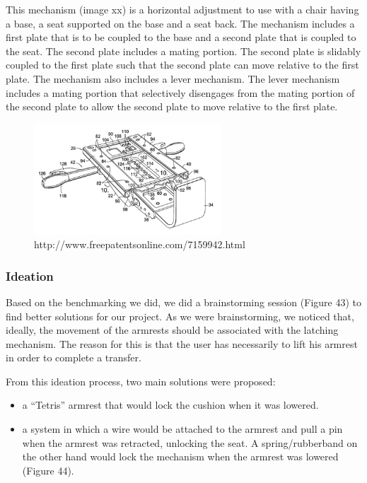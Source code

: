 This mechanism (image xx) is a horizontal adjustment to use with a chair having a base, a seat supported on the base and a seat back. The mechanism includes a first plate that is to be coupled to the base and a second plate that is coupled to the seat. The second plate includes a mating portion. The second plate is slidably coupled to the first plate such that the second plate can move relative to the first plate. The mechanism also includes a lever mechanism. The lever mechanism includes a mating portion that selectively disengages from the mating portion of the second plate to allow the second plate to move relative to the first plate.\\

\begin{figure}[h]
\centering
\includegraphics[width=7cm]{brazil_images/image045.png}
\caption{http://www.freepatentsonline.com/7159942.html}
\label{fig:patent}
\end{figure}

\subsubsection{Ideation}
Based on the benchmarking we did, we did a brainstorming session (Figure 43) to find better solutions for our project. As we were brainstorming, we noticed that, ideally, the movement of the armrests should be associated with the latching mechanism. The reason for this is that the user has necessarily to lift his armrest in order to complete a transfer. 

From this ideation process, two main solutions were proposed:

\begin{itemize}
	\item a “Tetris” armrest that would lock the cushion when it was lowered. 
	\item a system in which a wire would be attached to the armrest and pull a pin when the armrest was retracted, unlocking the seat. A spring/rubberband on the other hand would lock the mechanism when the armrest was lowered (Figure 44).
\end{itemize}

